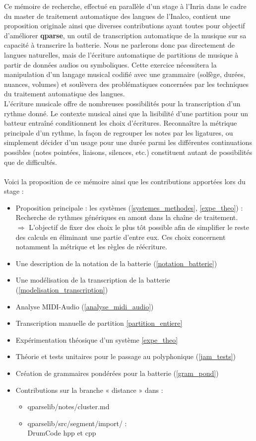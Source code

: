 Ce mémoire de recherche, effectué en parallèle d’un stage à l’Inria dans le cadre du master de traitement automatique des langues de l’Inalco, contient une proposition originale ainsi que diverses contributions ayant toutes pour objectif d’améliorer \textbf{qparse}, un outil de transcription automatique de la musique sur sa capacité à transcrire la batterie. Nous ne parlerons donc pas directement de langues naturelles, mais de l’écriture automatique de partitions de musique à partir de données audios ou symboliques. Cette exercice nécessitera la manipulation d’un langage musical codifié avec une grammaire (solfège, durées, nuances, volumes) et soulèvera des problématiques concernées par les techniques du traitement automatique des langues.\\
L’écriture musicale offre de nombreuses possibilités pour la transcription d’un rythme donné. Le contexte musical ainsi que la lisibilité d’une partition pour un batteur entraîné conditionnent les choix d’écritures. Reconnaître la métrique principale d’un rythme, la façon de regrouper les notes par les ligatures, ou simplement décider d’un usage pour une durée parmi les différentes continuations possibles (notes pointées, liaisons, silences, etc.) constituent autant de possibilités que de difficultés.\\\\
Voici la proposition de ce mémoire ainsi que les contributions apportées lors du stage :
\begin{itemize}
	\item Proposition principale : les systèmes (\ref{systemes_methodes}, \ref{expe_theo}) :\\
	Recherche de rythmes génériques en amont dans la chaîne de traitement.\\
	$\Rightarrow$ L’objectif de fixer des choix le plus tôt possible afin de simplifier le reste des calculs en éliminant une partie d’entre eux. Ces choix concernent notamment la métrique et les règles de réécriture.
	\item Une description de la notation de la batterie (\ref{notation_batterie})
	\item Une modélisation de la transcription de la batterie (\ref{modelisation_transcription})
	\item Analyse MIDI-Audio (\ref{analyse_midi_audio})
	\item Transcription manuelle de partition \ref{partition_entiere}
	\item Expérimentation théosique d’un système \ref{expe_theo}
	\item Théorie et tests unitaires pour le passage au polyphonique (\ref{jam_tests})
	\item Création de grammaires pondérées pour la batterie (\ref{gram_pond})
	\item Contributions sur la branche « distance » dans :
	\begin{itemize}
		\item qparselib/notes/cluster.md
		\item qparselib/src/segment/import/ :\\
		DrumCode hpp et cpp\\
	\end{itemize}
\end{itemize}
 
